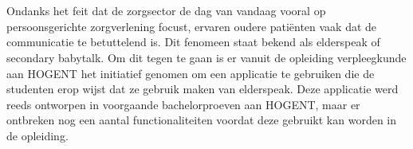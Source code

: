 
%
%
%
%
%

%



\chapter*{}

Ondanks het feit dat de zorgsector de dag van vandaag vooral op persoonsgerichte zorgverlening focust, ervaren oudere patiënten vaak dat de communicatie te betuttelend is. Dit fenomeen staat bekend als elderspeak of secondary babytalk. Om dit tegen te gaan is er vanuit de opleiding verpleegkunde aan HOGENT het initiatief genomen om een applicatie te gebruiken die de studenten erop wijst dat ze gebruik maken van elderspeak. Deze applicatie werd reeds ontworpen in voorgaande bachelorproeven aan HOGENT, maar er ontbreken nog een aantal functionaliteiten voordat deze gebruikt kan worden in de opleiding.

